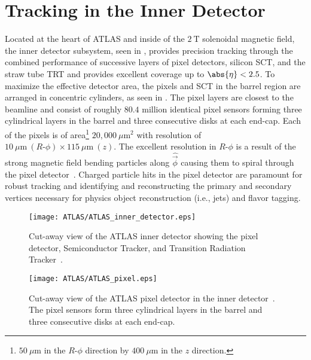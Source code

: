 \section{Tracking in the Inner Detector}\label{sec:ATLAS_ID}

Located at the heart of ATLAS and inside of the $2~\mathrm{T}$ solenoidal magnetic field, the \gls{inner detector} subsystem, seen in , provides precision tracking through the combined performance of successive layers of pixel detectors, silicon \gls{SCT}, and the straw tube \gls{TRT} and provides excellent coverage up to $\abs{\eta} < 2.5$.
To maximize the effective detector area, the pixels and SCT in the barrel region are arranged in concentric cylinders, as seen in .
The pixel layers are closest to the beamline and consist of roughly $80.4$ million identical pixel sensors forming three cylindrical layers in the barrel and three consecutive disks at each end-cap.
Each of the pixels is of area\footnote{$50~\mu\mathrm{m}$ in the $R\textrm{-}\phi$ direction by $400~\mu\mathrm{m}$ in the $z$ direction.} $20,000~\mu\mathrm{m}^{2}$ with resolution of $10~\mu\mathrm{m}~(R\textrm{-}\phi) \times 115~\mu\mathrm{m}~(z)$.
The excellent resolution in $R\textrm{-}\phi$ is a result of the strong magnetic field bending particles along $\hat{\vec{\phi}}$ causing them to spiral through the pixel detector~\cite{PERF-2007-01}.
Charged particle hits in the pixel detector are paramount for robust tracking and identifying and reconstructing the primary and secondary vertices necessary for physics object reconstruction (i.e., jets) and flavor tagging.

\begin{figure}[htbp]
 \centering
 \texttt{[image: ATLAS/ATLAS\_inner\_detector.eps]}
 \caption[Cut-away view of the ATLAS inner detector showing the pixel detector, Semiconductor Tracker, and Transition Radiation Tracker.]{%
  Cut-away view of the ATLAS inner detector showing the pixel detector, Semiconductor Tracker, and Transition Radiation Tracker~\cite{Pequenao:1095926}.}\label{fig:ATLAS_inner_detector}
\end{figure}

\begin{figure}[htbp]
 \centering
 \texttt{[image: ATLAS/ATLAS\_pixel.eps]}
 \caption[Cut-away view of the ATLAS pixel detector in the inner detector.]{%
  Cut-away view of the ATLAS pixel detector in the inner detector~\cite{Pequenao:1095925}.
  The pixel sensors form three cylindrical layers in the barrel and three consecutive disks at each end-cap.}\label{fig:ATLAS_pixel}
\end{figure}

